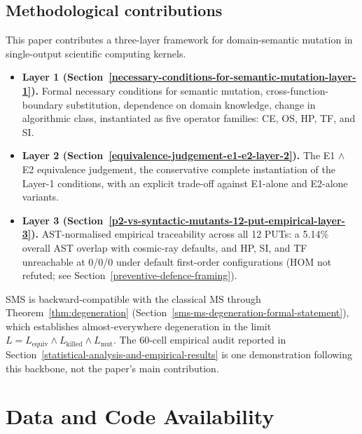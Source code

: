\documentclass[manuscript,screen,review]{acmart}
\begin{document}
\subsection{Methodological contributions}\label{methodological-contributions}

This paper contributes a three-layer framework for domain-semantic
mutation in single-output scientific computing kernels.

\begin{itemize}

\item
  \textbf{Layer 1 (Section~\ref{necessary-conditions-for-semantic-mutation-layer-1}).} Formal necessary conditions for semantic
  mutation, cross-function-boundary substitution, dependence on domain
  knowledge, change in algorithmic class, instantiated as five
  operator families: CE, OS, HP, TF, and SI.
\item
  \textbf{Layer 2 (Section~\ref{equivalence-judgement-e1-e2-layer-2}).} The E1 $\wedge$ E2 equivalence judgement, the
  conservative complete instantiation of the Layer-1 conditions, with an
  explicit trade-off against E1-alone and E2-alone variants.
\item
  \textbf{Layer 3 (Section~\ref{p2-vs-syntactic-mutants-12-put-empirical-layer-3}).} AST-normalised empirical traceability across
  all 12 PUTs: a 5.14\% overall AST overlap with cosmic-ray defaults,
  and HP, SI, and TF unreachable at 0/0/0 under default first-order
  configurations (HOM not refuted; see Section~\ref{preventive-defence-framing}).
\end{itemize}

SMS is backward-compatible with the classical MS through
Theorem~\ref{thm:degeneration} (Section~\ref{sms-ms-degeneration-formal-statement}), which establishes almost-everywhere degeneration in the limit
$L = L_{\mathrm{equiv}} \wedge L_{\mathrm{killed}} \wedge L_{\mathrm{mut}}$. The 60-cell empirical
audit reported in Section~\ref{statistical-analysis-and-empirical-results} is one demonstration following this backbone, not
the paper's main contribution.

\section*{Data and Code Availability}\label{data-and-code-availability}
\end{document}
